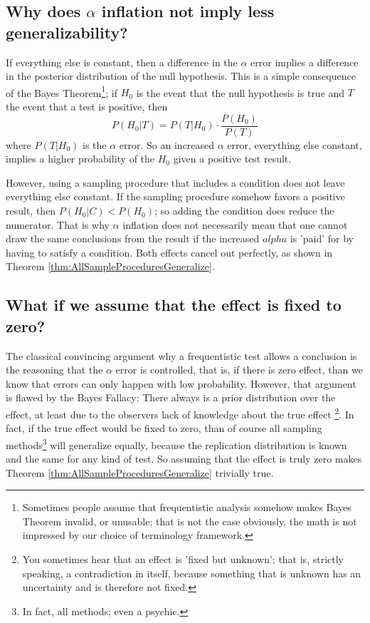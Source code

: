 \documentclass[man]{apa7}\usepackage[]{graphicx}\usepackage[]{xcolor}
\theoremstyle{definition}
\begin{document}
\subsection{Why does $\alpha$ inflation not imply less generalizability?}
If everything else is constant, then a difference in the $\alpha$ error implies a difference in the posterior distribution of the null hypothesis. This is a simple consequence of the Bayes Theorem\footnote{Sometimes people assume that frequentistic analysis somehow makes Bayes Theorem invalid, or unusable; that is not the case obviously, the math is not impressed by our choice of terminology framework.}; if $H_0$ is the event that the null hypothesis is true and $T$ the event that a test is positive, then
\[ P(H_0|T) = P(T|H_0) \cdot \frac{P(H_0)}{P(T)} \]
where $P(T|H_0)$ is the $\alpha$ error. So an increased $\alpha$ error, everything else constant, implies a higher probability of the $H_0$ given a positive test result.

However, using a sampling procedure that includes a condition does not leave everything else constant. If the sampling procedure somehow favors a positive result, then $P(H_0|C) < P(H_0)$; so adding the condition does reduce the numerator. That is why $\alpha$ inflation does not necessarily mean that one cannot draw the same conclusions from the result if the increased $alpha$ is 'paid' for by having to satisfy a condition. Both effects cancel out perfectly, as shown in Theorem \ref{thm:AllSampleProceduresGeneralize}.

\subsection{What if we assume that the effect is fixed to zero?}
The classical convincing argument why a frequentistic test allows a conclusion is the reasoning that the $\alpha$ error is controlled, that is, if there is zero effect, than we know that errors can only happen with low probability. However, that argument is flawed by the Bayes Fallacy: There always is a prior distribution over the effect, at least due to the observers lack of knowledge about the true effect \footnote{You sometimes hear that an effect is 'fixed but unknown'; that is, strictly speaking, a contradiction in itself, because something that is unknown has an uncertainty and is therefore not fixed.}. In fact, if the true effect would be fixed to zero, than of course all sampling methods\footnote{In fact, all methods; even a psychic.} will generalize equally, because the replication distribution is known and the same for any kind of test. So assuming that the effect is truly zero makes Theorem \ref{thm:AllSampleProceduresGeneralize} trivially true.
\end{document}
